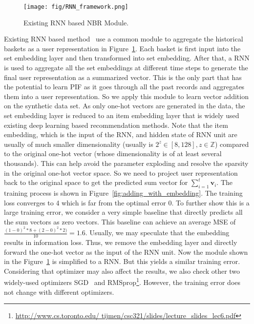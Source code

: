 \documentclass[sigconf]{acmart}
\begin{document}
\begin{figure}[!t]
\centerline{\texttt{[image: fig/RNN\_framework.png]}}
\caption{Existing RNN based NBR Module.}
\label{fig:RNN_framework}
\end{figure}

Existing RNN based method~\cite{hu2019sets2sets}\cite{yu2016dynamic} use a common  module to aggregate the historical baskets as a user representation in  Figure~\ref{fig:RNN_framework}.  Each basket is first input into the set embedding layer and then  transformed into set embedding. After that, a RNN is used to aggregate  all the set  embeddings at different time steps to  generate the final  user representation as a  summarized vector. This is the only part that has the potential to learn PIF as  it goes through all the past records and aggregates them into a user  representation. So we apply this module to learn vector addition on the synthetic data set. As only one-hot vectors are generated  in the data,  the set embedding  layer is reduced to an item embedding layer that is widely used existing deep learning based recommendation methods.  Note that the item embedding,  which is the input of the RNN,  and hidden state of RNN unit are usually of much smaller dimensionality  (usually is $2^z\in[8,  128], z\in\mathbb{Z}$) compared to the original one-hot vector (whose dimensionality is of  at least several thousands). This can help avoid the   parameter exploding and resolve the sparsity in the original one-hot vector space. So we  need to  project user  representation back to the original space to get the  predicted sum vector for  $\sum_{i=1}^t\mathbf{v}_i$. The training process is shown in  Figure~\ref{fig:adding_with_embedding}. The training loss converges to 4 which is far from the optimal error 0. To further show  this is a large  training error, we consider a very simple baseline that  directly predicts all the sum vectors as zero vectors. This baseline can  achieve an average MSE of  $\frac{(1-0)^2*8+(2-0)^2*2)}{10}=1.6$.  Usually, we may  speculate that the  embedding results in information loss. Thus, we remove the  embedding layer and directly forward the one-hot vector as the input of the RNN unit. Now the module shown in the  Figure~\ref{fig:RNN_framework} is simplified to a RNN. But this yields a similar  training error. Considering that optimizer may also affect the results,  we also check other two  widely-used  optimizers  SGD~\cite{bottou2010large} and RMSprop\footnote{\url{http://www.cs.toronto.edu/ tijmen/csc321/slides/lecture\_slides\_lec6.pdf}
}. However, the training  error does not change with different  optimizers. 
\end{document}

